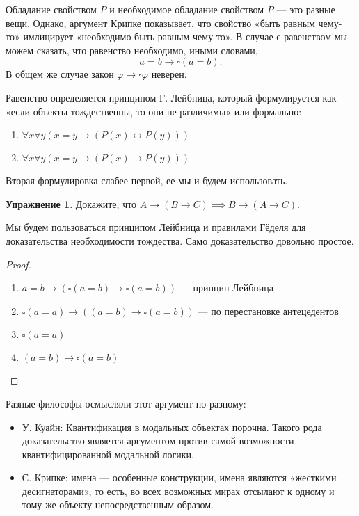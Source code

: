 \documentclass[openany]{book}
\theoremstyle{plain}
\theoremstyle{definition}
\newtheorem{xrc}{Упражнение}[]
\begin{document}
Обладание свойством \(P\) и необходимое обладание свойством \(P\) — это разные вещи. Однако, аргумент Крипке показывает, что свойство «быть равным чему-то» имлицирует «необходимо быть равным чему-то». В случае с равенством мы можем сказать, что равенство необходимо, иными словами, \[a = b \to \square(a = b).\] В общем же случае закон \(\varphi \to \square \varphi\) неверен.

Равенство определяется принципом Г. Лейбница, который формулируется как «если объекты тождественны, то они не различимы» или формально:
\begin{enumerate}
    \item \(\forall x \forall y (x = y \to (P(x) \leftrightarrow P(y)))\)
    \item \(\forall x \forall y (x = y \to (P(x) \to P(y)))\)
\end{enumerate}

Вторая формулировка слабее первой, ее мы и будем использовать.

\begin{xrc} 
    Докажите, что \(A \to (B \to C) \implies B \to (A \to C)\). 
\end{xrc}

Мы будем пользоваться принципом Лейбница и правилами Гёделя для доказательства необходимости тождества. Само доказательство довольно простое.

\begin{proof}
    \begin{enumerate}
	\item \(a = b \to (\square(a = b) \to \square(a = b))\) --- принцип Лейбница
	\item \(\square(a = a) \to ((a = b) \to \square(a = b))\) --- по перестановке антецедентов
	\item \(\square(a = a)\)
	\item \((a = b) \to \square(a = b)\)
    \end{enumerate}
\end{proof}

Разные философы осмысляли этот аргумент по-разному:
\begin{itemize}
    \item У. Куайн: Квантификация в модальных объектах порочна. Такого рода доказательство является аргументом против самой возможности квантифицированной модальной логики. 
    \item С. Крипке: имена — особенные конструкции, имена являются «жесткими десигнаторами», то есть, во всех возможных мирах отсылают к одному и тому же объекту непосредственным образом.
\end{itemize}
\end{document}
